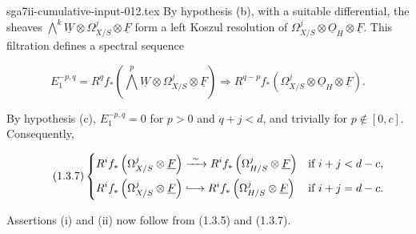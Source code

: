 \begin{filecontents*}{sga7ii-cumulative-input-012.tex}
By hypothesis (b), with a suitable differential, the sheaves
$\bigwedge^k\underline W\otimes\Omega^j_{X/S}\otimes\underline F$ form a
left Koszul resolution of
$\Omega^j_{X/S}\otimes\underline O_H\otimes\underline F$.  This
filtration defines a spectral sequence

\begin{equation}\tag{1.3.6}
E_1^{-p,q}=R^qf_*\left(\bigwedge^p\underline W\otimes
\Omega^j_{X/S}\otimes\underline F\right)
\Longrightarrow
R^{q-p}f_*\left(\Omega^j_{X/S}\otimes\underline O_H
\otimes\underline F\right).
\end{equation}

By hypothesis (c), $E_1^{-p,q}=0$ for $p>0$ and $q+j<d$, and trivially
for $p\notin[0,c]$.  Consequently,

\begin{equation}\tag{1.3.7}
\left\{
\begin{aligned}
R^if_*\left(\Omega^j_{X/S}\otimes\underline F\right)
&\xrightarrow{\ \sim\ }
R^if_*\left(\Omega^j_{H/S}\otimes\underline F\right)
&&\text{if }i+j<d-c,\\
R^if_*\left(\Omega^j_{X/S}\otimes\underline F\right)
&\lhook\joinrel\longrightarrow
R^if_*\left(\Omega^j_{H/S}\otimes\underline F\right)
&&\text{if }i+j=d-c.
\end{aligned}
\right.
\end{equation}

Assertions (i) and (ii) now follow from (1.3.5) and (1.3.7).

\end{filecontents*}
